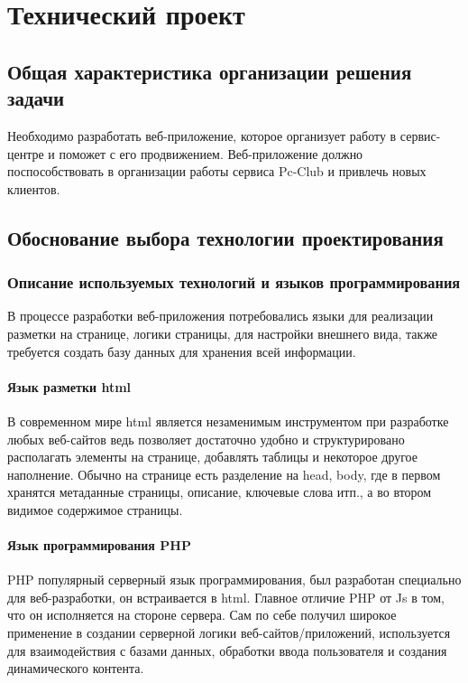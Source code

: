 \section{Технический проект}
\subsection{Общая характеристика организации решения задачи}

Необходимо разработать веб-приложение, которое организует работу в сервис-центре и поможет с его продвижением. Веб-приложение должно поспособствовать в организации работы сервиса Pc-Club и привлечь новых клиентов.

\subsection{Обоснование выбора технологии проектирования}
\subsubsection{Описание используемых технологий и языков программирования}

В процессе разработки веб-приложения потребовались языки для реализации разметки на странице, логики страницы, для настройки внешнего вида, также требуется создать базу данных для хранения всей информации. 

\paragraph{Язык разметки html}

В современном мире html является незаменимым инструментом при разработке любых веб-сайтов ведь позволяет достаточно удобно и структурировано располагать элементы на странице, добавлять таблицы и некоторое другое наполнение. Обычно на странице есть разделение на head, body, где в первом хранятся метаданные страницы, описание, ключевые слова итп., а во втором видимое содержимое страницы.

\paragraph{Язык программирования PHP}

PHP популярный серверный язык программирования, был разработан специально для веб-разработки, он встраивается в html. Главное отличие PHP от Js в том, что он исполняется на стороне сервера. Сам по себе получил широкое применение в создании серверной логики веб-сайтов/приложений, используется для взаимодействия с базами данных, обработки ввода пользователя и создания динамического контента.

